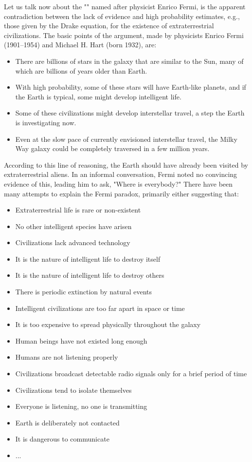 	Let us talk now about the ""  named after physicist Enrico Fermi, is the apparent contradiction between the lack of evidence and high probability estimates, e.g., those given by the Drake equation, for the existence of extraterrestrial civilizations. The basic points of the argument, made by physicists Enrico Fermi (1901–1954) and Michael H. Hart (born 1932), are:
	\begin{itemize}
		\item There are billions of stars in the galaxy that are similar to the Sun, many of which are billions of years older than Earth.
		\item With high probability, some of these stars will have Earth-like planets, and if the Earth is typical, some might develop intelligent life.
		\item Some of these civilizations might develop interstellar travel, a step the Earth is investigating now.
		\item Even at the slow pace of currently envisioned interstellar travel, the Milky Way galaxy could be completely traversed in a few million years.
	\end{itemize}
	According to this line of reasoning, the Earth should have already been visited by extraterrestrial aliens. In an informal conversation, Fermi noted no convincing evidence of this, leading him to ask, "Where is everybody?" There have been many attempts to explain the Fermi paradox, primarily either suggesting that:
	\begin{multicols}{2}
		\begin{itemize}
			\item Extraterrestrial life is rare or non-existent
			\item No other intelligent species have arisen
			\item Civilizations lack advanced technology
			\item It is the nature of intelligent life to destroy itself
			\item It is the nature of intelligent life to destroy others
			\item There is periodic extinction by natural events
			\item Intelligent civilizations are too far apart in space or time
			\item It is too expensive to spread physically throughout the galaxy
			\item Human beings have not existed long enough
			\item Humans are not listening properly
			\item Civilizations broadcast detectable radio signals only for a brief period of time
			\item Civilizations tend to isolate themselves
			\item Everyone is listening, no one is transmitting	
			\item Earth is deliberately not contacted
			\item It is dangerous to communicate
			\item ...
		\end{itemize}
		\end{multicols}
